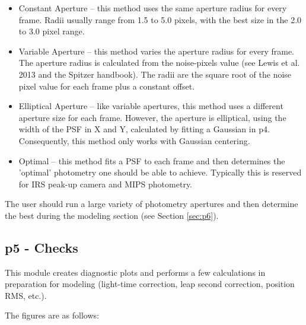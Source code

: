 \documentclass[letterpaper,12pt]{article}
\begin{document}
\begin{itemize}
\item Constant Aperture -- this method uses the same aperture radius
  for every frame. Radii usually range from 1.5 to 5.0 pixels, with the
  best size in the 2.0 to 3.0 pixel range.

\item Variable Aperture -- this method varies the aperture radius
  for every frame. The aperture radius is calculated from the
  noise-pixels value (see Lewis et al. 2013 and the Spitzer handbook).
  The radii are the square root of the noise pixel value for each frame
  plus a constant offset.

\item Elliptical Aperture -- like variable apertures, this method
  uses a different aperture size for each frame. However, the aperture
  is elliptical, using the width of the PSF in X and Y, calculated by
  fitting a Gaussian in p4. Consequently, this method only works
  with Gaussian centering.

\item Optimal -- this method fits a PSF to each frame and then
  determines the 'optimal' photometry one should be able to achieve.
  Typically this is reserved for IRS peak-up camera and MIPS photometry.

\end{itemize}

The user should run a large variety of photometry apertures and then
determine the best during the modeling section (see Section \ref{sec:p6}).


\subsection{p5 - Checks}
\label{sec:p5}
This module creates diagnostic plots and performs a few calculations
in preparation for modeling (light-time correction, leap second correction,
position RMS, etc.). 

The figures are as follows:
\end{document}
